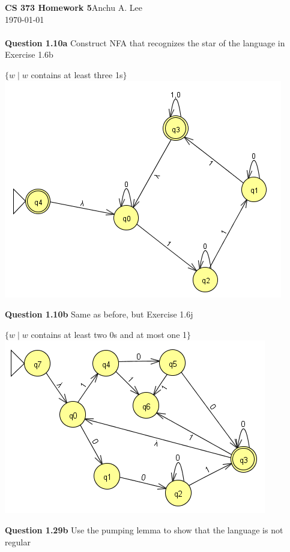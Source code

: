 \documentclass{article}
\begin{document}
    \noindent\textbf{CS 373 Homework 5}\hfill Anchu A. Lee\\
    \noindent\today\\\\
    \noindent\textbf{Question 1.10a} Construct NFA that recognizes the star of the language in Exercise 1.6b
        \begin{center}
            $\{w\mid w$ contains at least three 1s$\}$\\
            \includegraphics[scale=0.6]{q1}
        \end{center}
    \textbf{Question 1.10b} Same as before, but Exercise 1.6j
        \begin{center}
            $\{w\mid w $ contains at least two 0s and at most one 1$ \}$\\
            \includegraphics[scale=0.65]{q2}
        \end{center}
    \textbf{Question 1.29b} Use the pumping lemma to show that the language is not regular
\end{document}
